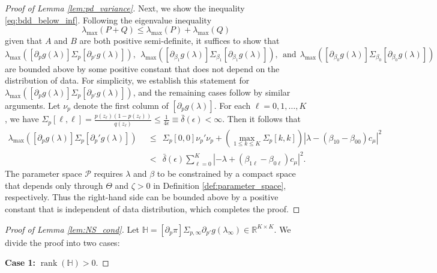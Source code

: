 \documentclass[11pt]{article}
\theoremstyle{definition}
\DeclareMathOperator*{\rank}{rank}
\newcommand{\R}{\ensuremath{\mathbb{R}}}
\newcommand{\0}{\ensuremath{\mathbf{0}}}
\begin{document}
\begin{bibunit}
\begin{proof}[Proof of Lemma \ref{lem:pd_variance}]
Next, we show the inequality \eqref{eq:bdd_below_inf}. Following the eigenvalue inequality
\[
    \lambda_{\max}(P+Q) \leq \lambda_{\max}(P) + \lambda_{\max}(Q)
\]
given that $A$ and $B$ are both positive semi-definite, it suffices to show that
\[
    \lambda_{\max} \left([\partial_p g(\lambda)]\Sigma_p[\partial_{p'} g(\lambda)]\right), ~~
    \lambda_{\max} \left([\partial_{\beta_1} g(\lambda)]\Sigma_{\beta_1}[\partial_{\beta_1} g(\lambda)]\right), 
    ~~ \text{and} ~~
    \lambda_{\max} \left([\partial_{\beta_0} g(\lambda)]\Sigma_{\beta_0}[\partial_{\beta_0} g(\lambda)]\right)
\]
are bounded above by some positive constant that does not depend on the distribution of data. For simplicity, we establish this statement for $\lambda_{\max} \left([\partial_p g(\lambda)]\Sigma_p[\partial_{p'} g(\lambda)]\right)$, and the remaining cases follow by similar arguments. Let $\nu_p$ denote the first column of $[\partial_p g(\lambda)]$. For each $\ell = 0,1,\ldots,K$, we have $\Sigma_{p}[\ell,\ell] = \frac{p(z_\ell)(1-p(z_\ell))}{q(z_\ell)} \leq \frac{1}{4\epsilon} \equiv \bar{\delta}(\epsilon) < \infty$. Then it follows that
\begin{align*}
    \lambda_{\max}([\partial_p g(\lambda)] \Sigma_p [\partial_p' g(\lambda)])
    ~~&\leq~~
    \Sigma_p[0,0] \nu_p'\nu_p + 
    \left(\max_{1\leq k \leq K}\Sigma_p[k,k]\right)|\lambda - (\beta_{10} - \beta_{00}) c_\mu|^2 \\
    ~~&<~~
    \bar{\delta}(\epsilon)\sum_{\ell = 0}^K |-\lambda + (\beta_{1\ell} - \beta_{0\ell})c_\mu|^2.
\end{align*}
The parameter space $\mathcal{P}$ requires $\lambda$ and $\beta$ to be constrained by a compact space that depends only through $\Theta$ and $\zeta > 0$ in Definition \ref{def:parameter_space}, respectively. Thus the right-hand side can be bounded above by a positive constant that is independent of data distribution, which completes the proof.
\end{proof}


\bigskip


%
\begin{proof}[Proof of Lemma \ref{lem:NS_cond}]
Let $\mathbb{H} = [\partial_p \pi] \Sigma_{p,\infty} \partial_{p'}g(\lambda_\infty) \in \R^{K\times K}$. We divide the proof into two cases: 

\medskip
\textbf{Case 1:} $\rank(\mathbb{H}) > 0$. 
\medskip


\end{proof}
\end{bibunit}
\end{document}
